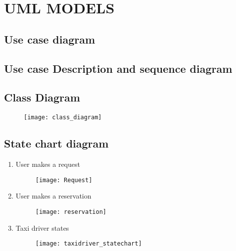 
\section{UML MODELS}
\subsection{Use case diagram}
\subsection{Use case Description and sequence diagram}
\subsection{Class Diagram}
\begin{figure}[h]
	\centering
	\texttt{[image: class\_diagram]}
\end{figure}
\newpage
\subsection{State chart diagram}
\begin{enumerate}
	\item User makes a request
	\begin{figure}[h]
		\centering
		\texttt{[image: Request]}
	\end{figure}

	\item User makes a reservation
	\begin{figure}[h]
		\centering
		\texttt{[image: reservation]}
	\end{figure}
	\newpage
	\item Taxi driver states
	\begin{figure}[h]
		\centering
		\texttt{[image: taxidriver\_statechart]}
	\end{figure}
\end{enumerate}
